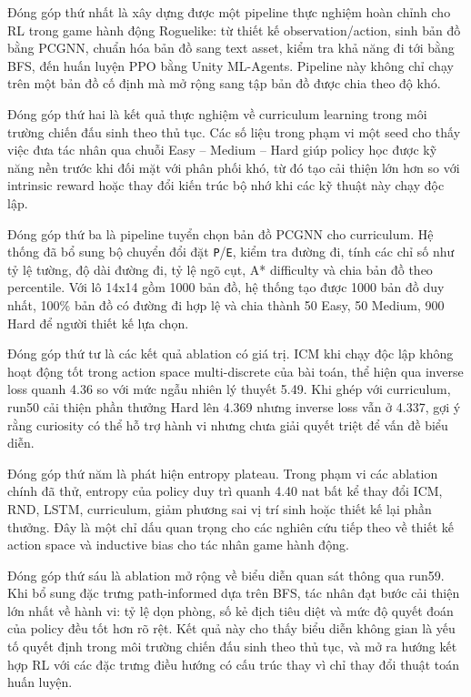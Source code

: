 Đóng góp thứ nhất là xây dựng được một pipeline thực nghiệm hoàn chỉnh cho RL trong game hành động Roguelike: từ thiết kế observation/action, sinh bản đồ bằng PCGNN, chuẩn hóa bản đồ sang text asset, kiểm tra khả năng đi tới bằng BFS, đến huấn luyện PPO bằng Unity ML-Agents. Pipeline này không chỉ chạy trên một bản đồ cố định mà mở rộng sang tập bản đồ được chia theo độ khó.

Đóng góp thứ hai là kết quả thực nghiệm về curriculum learning trong môi trường chiến đấu sinh theo thủ tục. Các số liệu trong phạm vi một seed cho thấy việc đưa tác nhân qua chuỗi Easy -- Medium -- Hard giúp policy học được kỹ năng nền trước khi đối mặt với phân phối khó, từ đó tạo cải thiện lớn hơn so với intrinsic reward hoặc thay đổi kiến trúc bộ nhớ khi các kỹ thuật này chạy độc lập.

Đóng góp thứ ba là pipeline tuyển chọn bản đồ PCGNN cho curriculum. Hệ thống đã bổ sung bộ chuyển đổi đặt \texttt{P}/\texttt{E}, kiểm tra đường đi, tính các chỉ số như tỷ lệ tường, độ dài đường đi, tỷ lệ ngõ cụt, A* difficulty và chia bản đồ theo percentile. Với lô 14x14 gồm 1000 bản đồ, hệ thống tạo được 1000 bản đồ duy nhất, 100\% bản đồ có đường đi hợp lệ và chia thành 50 Easy, 50 Medium, 900 Hard để người thiết kế lựa chọn.

Đóng góp thứ tư là các kết quả ablation có giá trị. ICM khi chạy độc lập không hoạt động tốt trong action space multi-discrete của bài toán, thể hiện qua inverse loss quanh 4.36 so với mức ngẫu nhiên lý thuyết 5.49. Khi ghép với curriculum, run50 cải thiện phần thưởng Hard lên 4.369 nhưng inverse loss vẫn ở 4.337, gợi ý rằng curiosity có thể hỗ trợ hành vi nhưng chưa giải quyết triệt để vấn đề biểu diễn.

Đóng góp thứ năm là phát hiện entropy plateau. Trong phạm vi các ablation chính đã thử, entropy của policy duy trì quanh 4.40 nat bất kể thay đổi ICM, RND, LSTM, curriculum, giảm phương sai vị trí sinh hoặc thiết kế lại phần thưởng. Đây là một chỉ dấu quan trọng cho các nghiên cứu tiếp theo về thiết kế action space và inductive bias cho tác nhân game hành động.

Đóng góp thứ sáu là ablation mở rộng về biểu diễn quan sát thông qua run59. Khi bổ sung đặc trưng path-informed dựa trên BFS, tác nhân đạt bước cải thiện lớn nhất về hành vi: tỷ lệ dọn phòng, số kẻ địch tiêu diệt và mức độ quyết đoán của policy đều tốt hơn rõ rệt. Kết quả này cho thấy biểu diễn không gian là yếu tố quyết định trong môi trường chiến đấu sinh theo thủ tục, và mở ra hướng kết hợp RL với các đặc trưng điều hướng có cấu trúc thay vì chỉ thay đổi thuật toán huấn luyện.

